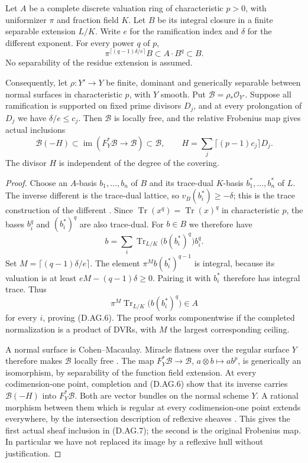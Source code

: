 \begin{lemma}
\label{D:normalization-Frobenius-saturation}
Let $A$ be a complete discrete valuation ring of characteristic
$p>0$, with uniformizer $\pi$ and fraction field $K$. Let $B$
be its integral closure in a finite separable extension $L/K$.
Write $e$ for the ramification index and $\delta$ for the
different exponent. For every power $q$ of $p$,
\[
  \pi^{\lceil(q-1)\delta/e\rceil}B
                     \subset A\cdot B^q\subset B.      \tag{D.AG.6}
\]
No separability of the residue extension is assumed.

Consequently, let $\rho:Y'\to Y$ be finite, dominant and
generically separable between normal surfaces in characteristic
$p$, with $Y$ smooth. Put $\mathcal B=\rho_*\mathcal O_{Y'}$.
Suppose all ramification is supported on fixed prime divisors
$D_j$, and at every prolongation of $D_j$ we have
$\delta/e\le c_j$. Then $\mathcal B$ is locally free, and the
relative Frobenius map gives actual inclusions
\[
 \mathcal B(-H)\subset
       \operatorname{im}(F_Y^*\mathcal B\longrightarrow\mathcal B)
       \subset\mathcal B,
 \qquad H=\sum_j\lceil(p-1)c_j\rceil D_j.              \tag{D.AG.7}
\]
The divisor $H$ is independent of the degree of the covering.
\end{lemma}
\begin{proof}
Choose an $A$-basis $b_1,\ldots,b_n$ of $B$ and its trace-dual
$K$-basis $b_1^*,\ldots,b_n^*$ of $L$. The inverse different is
the trace-dual lattice, so $v_B(b_i^*)\ge-\delta$; this is the
trace construction of the different
\citep[Section~49.8]{StacksDDifferent}. Since
$\operatorname{Tr}(x^q)=\operatorname{Tr}(x)^q$ in characteristic
$p$, the bases $b_i^q$ and $(b_i^*)^q$ are also trace-dual.
For $b\in B$ we therefore have
\[
        b=\sum_i\operatorname{Tr}_{L/K}
                         \bigl(b(b_i^*)^q\bigr)b_i^q.
\]
Set $M=\lceil(q-1)\delta/e\rceil$. The element
$\pi^M b(b_i^*)^{q-1}$ is integral, because its valuation
is at least $eM-(q-1)\delta\ge0$. Pairing it with $b_i^*$
therefore has integral trace. Thus
\[
 \pi^M\operatorname{Tr}_{L/K}\bigl(b(b_i^*)^q\bigr)\in A
\]
for every $i$, proving (D.AG.6). The proof works componentwise
if the completed normalization is a product of DVRs, with
$M$ the largest corresponding ceiling.

A normal surface is Cohen--Macaulay. Miracle flatness over the
regular surface $Y$ therefore makes $\mathcal B$ locally free
\citep[Tag 00R4]{StacksArithmeticDefectB}. The map
$F_Y^*\mathcal B\to\mathcal B$, $a\otimes b\mapsto ab^p$,
is generically an isomorphism, by separability of the function
field extension. At every codimension-one point, completion
and (D.AG.6) show that its inverse carries
$\mathcal B(-H)$ into $F_Y^*\mathcal B$.
Both are vector bundles on the normal scheme $Y$. A rational
morphism between them which is regular at every codimension-one
point extends everywhere, by the intersection description of
reflexive sheaves \citep[Tag 0EBJ]{C_StacksPicNorm}. This gives the first actual sheaf inclusion
in (D.AG.7); the second is the original Frobenius map. In
particular we have not replaced its image by a reflexive hull
without justification.
\end{proof}


